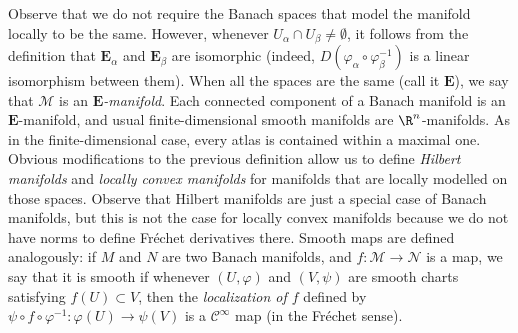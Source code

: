 Observe that we do not require the Banach spaces that model the manifold locally to be the same. However, whenever \(U_\alpha \cap U_\beta \neq \emptyset\), it follows from the definition that \(\mathbf{E}_\alpha\) and \(\mathbf{E}_\beta\) are isomorphic (indeed, \(D(\varphi_\alpha \circ \varphi_\beta^{-1})\) is a linear isomorphism between them). When all the spaces are the same (call it \(\mathbf{E}\)), we say that \(\mathcal{M}\) is an \textit{\(\mathbf{E}\)-manifold}. Each connected component of a Banach manifold is an \(\mathbf{E}\)-manifold, and usual finite-dimensional smooth manifolds are \(\R^n\)-manifolds. As in the finite-dimensional case, every atlas is contained within a maximal one. Obvious modifications to the previous definition allow us to define \textit{Hilbert manifolds} and \textit{locally convex manifolds} for manifolds that are locally modelled on those spaces. Observe that Hilbert manifolds are just a special case of Banach manifolds, but this is not the case for locally convex manifolds because we do not have norms to define Fréchet derivatives there. Smooth maps are defined analogously: if \(M\) and \(N\) are two Banach manifolds, and \(f \colon \mathcal{M} \to \mathcal{N}\) is a map, we say that it is smooth if whenever \((U, \varphi)\) and \((V, \psi)\) are smooth charts satisfying \(f(U) \subset V\), then the \textit{localization of \(f\)} defined by \(\psi\circ f \circ \varphi^{-1}\colon \varphi(U) \to \psi(V)\) is a \(\mathscr{C}^\infty\) map (in the Fréchet sense).


